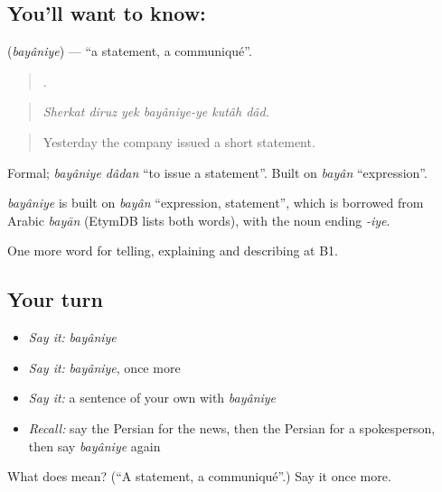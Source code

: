 \subsection*{You'll want to know: }
\textbf{} (\emph{bayâniye}) — \textquotedblleft{}a statement, a communiqué\textquotedblright{}.

\begin{quote}
     .
\end{quote}

\begin{quote}
\emph{Sherkat diruz yek bayâniye-ye kutâh dâd.}
\end{quote}

\begin{quote}
Yesterday the company issued a short statement.
\end{quote}

Formal; \emph{bayâniye dâdan} \textquotedblleft{}to issue a statement\textquotedblright{}. Built on \emph{bayân} \textquotedblleft{}expression\textquotedblright{}.

\begin{cousinweb}
\emph{bayâniye} is built on \emph{bayân} \textquotedblleft{}expression, statement\textquotedblright{}, which is borrowed from Arabic \emph{bayān} (EtymDB lists both words), with the noun ending \emph{-iye}.
\end{cousinweb}

\begin{grammarlens}[title={What you've built}]
One more word for telling, explaining and describing at B1.
\end{grammarlens}

\subsection*{Your turn}
\begin{itemize}
\raggedright
  \item \emph{Say it:} \emph{bayâniye}
  \item \emph{Say it:} \emph{bayâniye}, once more
  \item \emph{Say it:} a sentence of your own with \emph{bayâniye}
  \item \emph{Recall:} say the Persian for the news, then the Persian for a spokesperson, then say \emph{bayâniye} again
\end{itemize}

\begin{tcolorbox}[breakable,colback=teal!4,colframe=teal!35!black,title={Before you move on}]
What does  mean? (\textquotedblleft{}A statement, a communiqué\textquotedblright{}.) Say it once more.
\end{tcolorbox}
